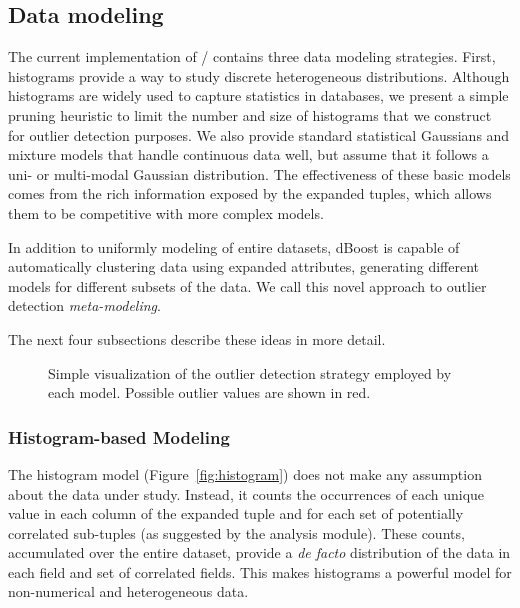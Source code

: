 \subsection{Data modeling}
\label{sec:model-creation}

The current implementation of \dBoost/ contains three data modeling strategies. 
First, histograms provide a way to study discrete heterogeneous distributions. Although histograms are widely used to capture statistics in databases, we present a simple pruning heuristic to limit the number and size of histograms that we construct for outlier detection purposes.
We also provide standard statistical Gaussians and mixture models that handle continuous data well, but assume that it follows a uni- or multi-modal Gaussian distribution.
The effectiveness of these basic models comes from the rich information exposed by the expanded tuples, which allows them to be competitive with more complex models.

In addition to uniformly modeling of entire datasets, dBoost is capable of automatically clustering data using expanded attributes, generating different models for different subsets of the data. We call this novel approach to outlier detection \emph{meta-modeling}.

The next four subsections describe these ideas in more detail.

\begin{figure}
  \centering
  \newcommand{\cramped}[3]{\subfloat[#2]{\texttt{[image: \#1]}\label{fig:#3}}}
  \cramped{../../graphics/histograms-preview.pdf}{Histogram}{histogram}
  \cramped{../../graphics/gaussians-preview.pdf}{Gaussian}{gaussian}\hspace*{.01\linewidth}
  \cramped{../../graphics/mixtures-preview.png}{Mixture}{mixture}\hspace*{.01\linewidth}
  \caption{Simple visualization of the outlier detection strategy employed by each model. Possible outlier values are shown in red.}
  \label{fig:models}
\end{figure}

\subsubsection{Histogram-based Modeling}
\label{sec:histograms}

The histogram model (Figure~\ref{fig:histogram}) does not make any assumption about the data under study. Instead, it counts the occurrences of each unique value in each column of the expanded tuple and for each set of potentially correlated sub-tuples (as suggested by the analysis module). These counts, accumulated over the entire dataset, provide a \emph{de facto} distribution of the data in each field and set of correlated fields.
This makes histograms a powerful model for non-numerical and heterogeneous data.

